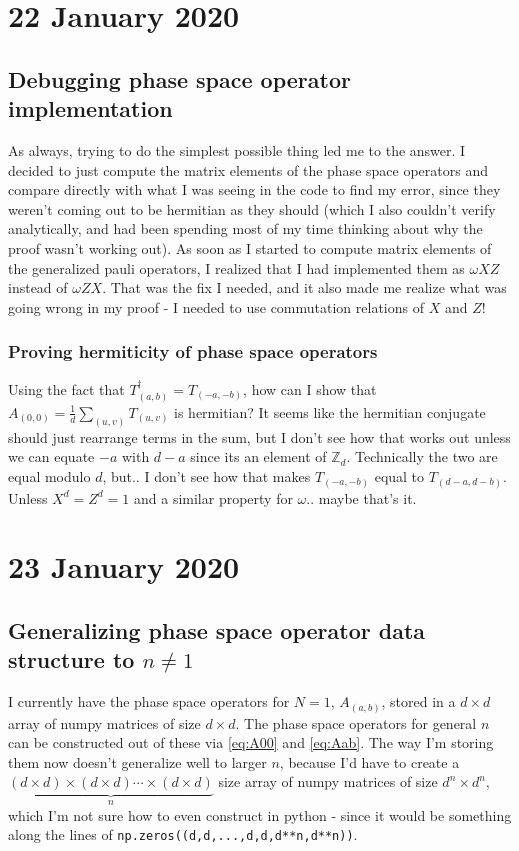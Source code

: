 \documentclass{report}
\begin{document}
\chapter{22 January 2020}

\section{Debugging phase space operator implementation}

As always, trying to do the simplest possible thing led me to the answer. I decided to just compute the matrix elements of the phase space operators and compare directly with what I was seeing in the code to find my error, since they weren't coming out to be hermitian as they should (which I also couldn't verify analytically, and had been spending most of my time thinking about why the proof wasn't working out). As soon as I started to compute matrix elements of the generalized pauli operators, I realized that I had implemented them as $\omega XZ$ instead of $\omega ZX$. That was the fix I needed, and it also made me realize what was going wrong in my proof - I needed to use commutation relations of $X$ and $Z$!

\subsection{Proving hermiticity of phase space operators} 

Using the fact that $T_{(a,b)}^\dagger=T_{(-a,-b)}$, how can I show that $A_{(0,0)}=\frac{1}{d}\sum_{(u,v)}T_{(u,v)}$ is hermitian? It seems like the hermitian conjugate should just rearrange terms in the sum, but I don't see how that works out unless we can equate $-a$ with $d-a$ since its an element of $\mathbb Z_d$. Technically the two are equal modulo $d$, but.. I don't see how that makes $T_{(-a,-b)}$ equal to $T_{(d-a,d-b)}$. Unless $X^d=Z^d=1$ and a similar property for $\omega$.. maybe that's it. 
 
 
 \chapter{23 January 2020}
 
 
\section{Generalizing phase space operator data structure to $n\neq 1$}

I currently have the phase space operators for $N=1$, $A_{(a,b)}$, stored in a $d\times d$ array of numpy matrices of size $d\times d$. The phase space operators for general $n$ can be constructed out of these via \eqref{eq:A00} and \eqref{eq:Aab}. The way I'm storing them now doesn't generalize well to larger $n$, because I'd have to create a $\underbrace{(d\times d)\times (d\times d)\cdots \times (d\times d)}_{n}$ size array of numpy matrices of size $d^n\times d^n$, which I'm not sure how to even construct in python - since it would be something along the lines of \lstinline{np.zeros((d,d,...,d,d,d**n,d**n))}. 
\end{document}
